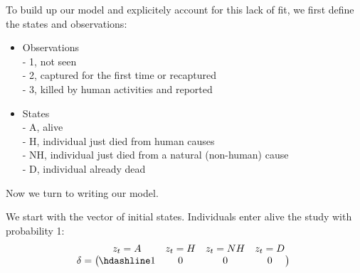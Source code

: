 \documentclass[
  12pt,
]{krantz}
\begin{document}
To build up our model and explicitely account for this lack of fit, we first define the states and observations:

\begin{itemize}
\item
  Observations\\
  - 1, not seen\\
  - 2, captured for the first time or recaptured\\
  - 3, killed by human activities and reported
\item
  States\\
  - A, alive\\
  - H, individual just died from human causes\\
  - NH, individual just died from a natural (non-human) cause\\
  - D, individual already dead
\end{itemize}

Now we turn to writing our model.

We start with the vector of initial states. Individuals enter alive the study with probability 1:
\[\begin{matrix}
& \\
\mathbf{\delta} =
\left ( \vphantom{ \begin{matrix} 12 \end{matrix} } \right .
\end{matrix}
\hspace{-1.2em}
\begin{matrix}
z_t=A & z_t=H & z_t=NH & z_t=D \\ \hdashline
1 & 0 & 0 & 0\\
\end{matrix}
\hspace{-0.2em}
\begin{matrix}
& \\
\left . \vphantom{ \begin{matrix} 12 \end{matrix} } \right )
\begin{matrix}
\end{matrix}
\end{matrix}\]
\end{document}
